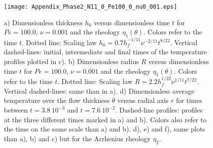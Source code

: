 \begin{figure}
  \begin{center}
    \graphicspath{ {/Users/thorey/Documents/These/Projet/Refroidissement/Skin_Model/Figure/Figure_Heating/} }
    \texttt{[image: Appendix\_Phase2\_N11\_0\_Pe100\_0\_nu0\_001.eps]}
    \caption{a)  Dimensionless  thickness $h_0$  versus  dimensionless
      time   $t$  for   $Pe=100.0$,  $\nu=0.001$   and  the   rheology
      $\eta_1(\theta)$.  Colors  refer to the time  $t$.  Dotted line:
      Scaling  law $h_0=  0.7h_f^{-1/11}\nu^{-2/11}t^{8/22}$. Vertical
      dashed-lines:  initial,  intermediate  and final  times  of  the
      temperature profiles plotted in  c). b) Dimensionless radius $R$
      versus dimensionless  time $t$  for $Pe=100.0$,  $\nu=0.001$ and
      the rheology  $\eta_1(\theta)$.  Colors  refer to the  time $t$.
      Dotted line:  Scaling law  $R= 2.2h_f^{1/22}\nu^{1/11}t^{7/22}$.
      Vertical dashed-lines: same than in a). d) Dimensionless average
      temperature over  the flow thickness  $\overline{\theta}$ versus
      radial   axis  $r$   for  times   between  $t=3.8~10^{-3}$   and
      $t=7.6~10^{-2}$.   Dashed-line profiles:  profiles at  the three
      different times  marked in a) and  b). Colors also refer  to the
      time on  the same  scale than a)  and b).  d),  e) and  f), same
      plots  than  a),  b)  and  c) but  for  the  Arrhenius  rheology
      $\eta_2$.}
    \label{Appendix_Phase2_N11_0_Pe100_0_nu0_001}
  \end{center}
\end{figure}







